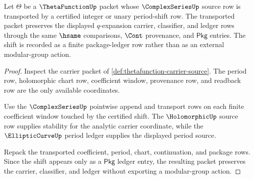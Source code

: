 \begin{theorem}
\label{thm:thetafunction-modular-shift-ledger}
Let $\Theta$ be a $\ThetaFunctionUp$ packet whose $\ComplexSeriesUp$ source row is transported by a certified integer or unary period-shift row. The transported packet preserves the displayed $q$-expansion carrier, classifier, and ledger rows through the same $\hsame$ comparisons, $\Cont$ provenance, and $\mathsf{Pkg}$ entries. The shift is recorded as a finite package-ledger row rather than as an external modular-group action.
\end{theorem}
\begin{proof}
Inspect the carrier packet of \autoref{def:thetafunction-carrier-source}. The period row, holomorphic chart row, coefficient window, provenance row, and readback row are the only available coordinates.

Use the $\ComplexSeriesUp$ pointwise append and transport rows on each finite coefficient window touched by the certified shift. The $\HolomorphicUp$ source row supplies stability for the analytic carrier coordinate, while the $\EllipticCurveUp$ period ledger supplies the displayed period source.

Repack the transported coefficient, period, chart, continuation, and package rows. Since the shift appears only as a $\mathsf{Pkg}$ ledger entry, the resulting packet preserves the carrier, classifier, and ledger without exporting a modular-group action.
\end{proof}


